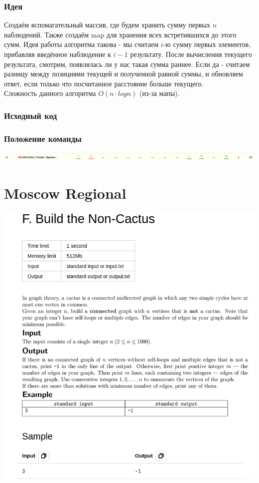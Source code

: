 \documentclass[12pt]{article}
\begin{document}
\subsubsection*{Идея}
Создаём вспомагательный массив, где будем хранить сумму первых $n$ наблюдений. Также создаём map для хранения всех встретившихся до этого сумм.
Идея работы алгоритма такова - мы считаем $i$-ю сумму первых элементов, прибавляя введённое наблюдение к $i-1$ результату. После вычисления текущего результата,
смотрим, появлялась ли у нас такая сумма раннее. Если да - считаем разницу между позициями текущей и полученной равной суммы, и обновляем ответ, если только что
посчитанное расстояние больше текущего.
\\ 
Сложность данного алгоритма $O(n \cdot log{n})$ (из-за мапы).
\subsubsection*{Исходный код}

\subsubsection*{Положение команды}
\includegraphics[scale=0.35]{images/9.png}\newline\noindent



\pagebreak
\section{Moscow Regional}
\includegraphics[scale=0.75]{statements/QuarterFinal_F.png}
\end{document}
